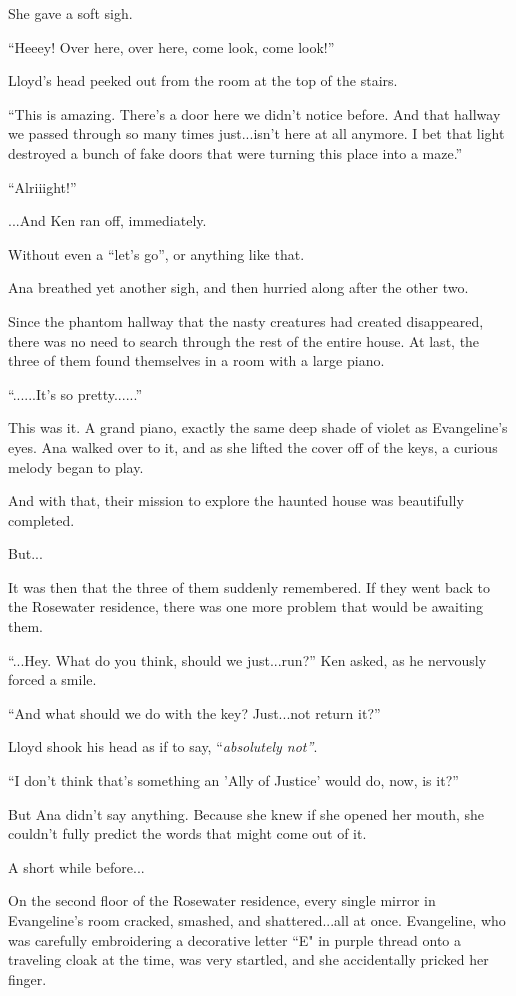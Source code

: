 \documentclass[
]{article}
\begin{document}
She gave a soft sigh.

``Heeey! Over here, over here, come look, come look!''

Lloyd's head peeked out from the room at the top of the stairs.

``This is amazing. There's a door here we didn't notice before. And that
hallway we passed through so many times just...isn't here at all
anymore. I bet that light destroyed a bunch of fake doors that were
turning this place into a maze.''

``Alriiight!''

...And Ken ran off, immediately.

Without even a ``let's go'', or anything like that.

Ana breathed yet another sigh, and then hurried along after the other
two.

Since the phantom hallway that the nasty creatures had created
disappeared, there was no need to search through the rest of the entire
house. At last, the three of them found themselves in a room with a
large piano.

``......It's so pretty......''

This was it. A grand piano, exactly the same deep shade of violet as
Evangeline's eyes. Ana walked over to it, and as she lifted the cover
off of the keys, a curious melody began to play.

And with that, their mission to explore the haunted house was
beautifully completed.

But...

It was then that the three of them suddenly remembered. If they went
back to the Rosewater residence, there was one more problem that would
be awaiting them.

``...Hey. What do you think, should we just...run?'' Ken asked, as he
nervously forced a smile.

``And what should we do with the key? Just...not return it?''

Lloyd shook his head as if to say, ``\emph{absolutely not''}.

``I don't think that's something an 'Ally of Justice' would do, now, is
it?''

But Ana didn't say anything. Because she knew if she opened her mouth,
she couldn't fully predict the words that might come out of it.

A short while before...

On the second floor of the Rosewater residence, every single mirror in
Evangeline's room cracked, smashed, and shattered...all at once.
Evangeline, who was carefully embroidering a decorative letter ``E" in
purple thread onto a traveling cloak at the time, was very startled, and
she accidentally pricked her finger.
\end{document}
